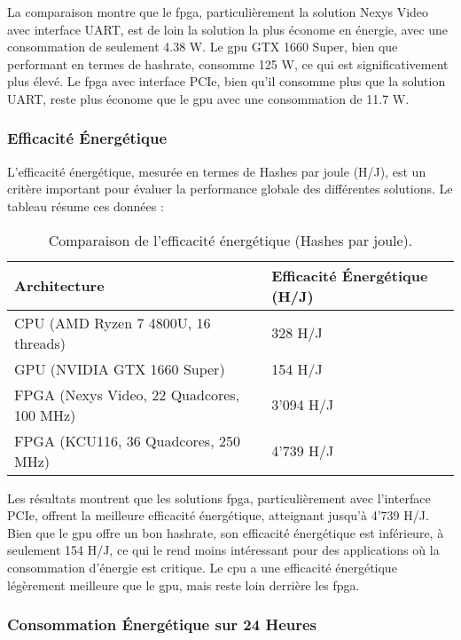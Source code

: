 La comparaison montre que le \gls{fpga}, particulièrement la solution Nexys Video avec interface UART, est de loin la solution la plus économe en énergie, avec une consommation de seulement 4.38 W. 
Le \gls{gpu} GTX 1660 Super, bien que performant en termes de hashrate, consomme 125 W, ce qui est significativement plus élevé. 
Le \gls{fpga} avec interface PCIe, bien qu'il consomme plus que la solution UART, reste plus économe que le \gls{gpu} avec une consommation de 11.7 W.

\subsubsection{Efficacité Énergétique}

L'efficacité énergétique, mesurée en termes de Hashes par joule (H/J), est un critère important pour évaluer la performance globale des différentes solutions. 
Le tableau résume ces données :

\begin{table}[tbph!]
    \centering
    \begin{tabular}{|l|l|}
    \hline
        \textbf{Architecture} & \textbf{Efficacité Énergétique (H/J)} \\ \hline
        CPU (AMD Ryzen 7 4800U, 16 threads) & 328 H/J \\ \hline
        GPU (NVIDIA GTX 1660 Super) & 154 H/J \\ \hline
        FPGA (Nexys Video, 22 Quadcores, 100 MHz) & 3'094 H/J \\ \hline
        FPGA (KCU116, 36 Quadcores, 250 MHz) & 4'739 H/J \\ \hline
    \end{tabular}
    \caption{Comparaison de l'efficacité énergétique (Hashes par joule).}
    \label{tab:efficiency_comparison}
\end{table}

Les résultats montrent que les solutions \gls{fpga}, particulièrement avec l'interface PCIe, offrent la meilleure efficacité énergétique, atteignant jusqu'à 4'739 H/J. 
Bien que le \gls{gpu} offre un bon hashrate, son efficacité énergétique est inférieure, à seulement 154 H/J, ce qui le rend moins intéressant pour des applications où la consommation d'énergie est critique. 
Le \gls{cpu} a une efficacité énergétique légèrement meilleure que le \gls{gpu}, mais reste loin derrière les \gls{fpga}.

\newpage

\subsubsection{Consommation Énergétique sur 24 Heures}

